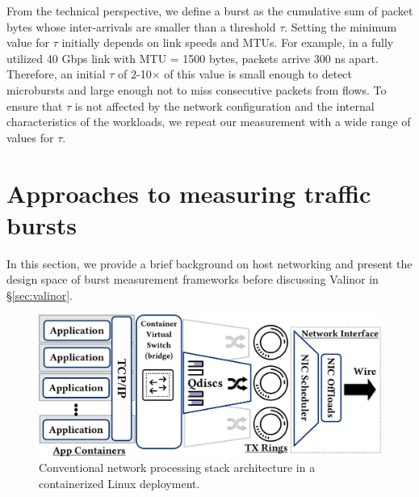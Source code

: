 From the technical perspective, we define a burst as the cumulative sum of packet bytes whose inter-arrivals are smaller than a threshold $\tau$. Setting the minimum value for $\tau$ initially depends on link speeds and MTUs. For example, in a fully utilized 40 Gbps link with MTU = 1500 bytes, packets arrive 300 ns apart. Therefore, an initial $\tau$ of 2-10$\times$ of this value is small enough to detect microbursts and large enough not to miss consecutive packets from flows. To ensure that $\tau$ is not affected by the network configuration and the internal characteristics of the workloads, we repeat our measurement with a wide range of values for $\tau$.


\section{Approaches to measuring traffic bursts}
\label{sec:valinor-space}
In this section, we provide a brief background on host networking and present the design space of burst measurement frameworks before discussing Valinor in \S\ref{sec:valinor}.

\begin{figure}
    \centering
    	\includegraphics[width=0.80\linewidth]{figs/hostack-crop.pdf}
    \caption{\small{Conventional network processing stack architecture in a containerized Linux deployment.}}
    \vspace{-2mm}
	\label{fig:hostack}
	    \vspace{-3mm}
\end{figure}

